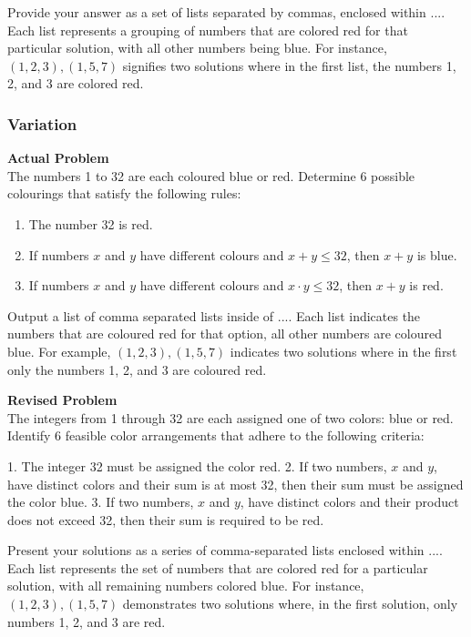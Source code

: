 Provide your answer as a set of lists separated by commas, enclosed within $\boxed{...}$. Each list represents a grouping of numbers that are colored red for that particular solution, with all other numbers being blue. For instance, $\boxed{(1,2,3),(1,5,7)}$ signifies two solutions where in the first list, the numbers 1, 2, and 3 are colored red.

\subsubsection{Variation}
\textbf{Actual Problem}\\
The numbers 1 to 32 are each coloured blue or red. Determine 6 possible colourings that satisfy the following rules:

\begin{enumerate}
\item The number 32 is red.
\item If numbers $x$ and $y$ have different colours and $x + y \leqslant 32$, then $x + y$ is blue.
\item If numbers $x$ and $y$ have different colours and $x \cdot y \leqslant 32$, then $x + y$ is red.
\end{enumerate}

Output a list of comma separated lists inside of $\boxed{...}$. Each list indicates the numbers that are coloured red for that option, all other numbers are coloured blue. For example, $\boxed{(1,2,3),(1,5,7)}$ indicates two solutions where in the first only the numbers 1, 2, and 3 are coloured red. 

\textbf{Revised Problem}\\
The integers from 1 through 32 are each assigned one of two colors: blue or red. Identify 6 feasible color arrangements that adhere to the following criteria:

1. The integer 32 must be assigned the color red.
2. If two numbers, $x$ and $y$, have distinct colors and their sum is at most 32, then their sum must be assigned the color blue.
3. If two numbers, $x$ and $y$, have distinct colors and their product does not exceed 32, then their sum is required to be red.

Present your solutions as a series of comma-separated lists enclosed within $\boxed{...}$. Each list represents the set of numbers that are colored red for a particular solution, with all remaining numbers colored blue. For instance, $\boxed{(1,2,3),(1,5,7)}$ demonstrates two solutions where, in the first solution, only numbers 1, 2, and 3 are red.

